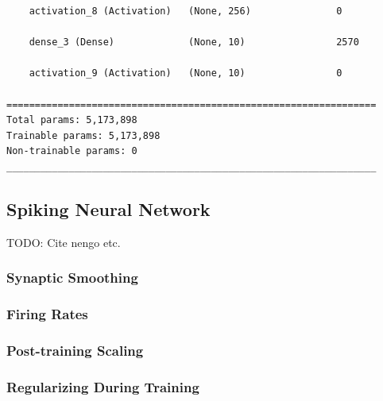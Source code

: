 \begin{lstlisting}
    activation_8 (Activation)   (None, 256)               0         
                                                                    
    dense_3 (Dense)             (None, 10)                2570      
                                                                    
    activation_9 (Activation)   (None, 10)                0         
                                                                    
=================================================================
Total params: 5,173,898
Trainable params: 5,173,898
Non-trainable params: 0
_________________________________________________________________
\end{lstlisting}

\subsection{Spiking Neural Network}

\color{red} TODO: Cite nengo etc. \color{black}

\subsubsection{Synaptic Smoothing}

\subsubsection{Firing Rates}

\subsubsection{Post-training Scaling}

\subsubsection{Regularizing During Training}